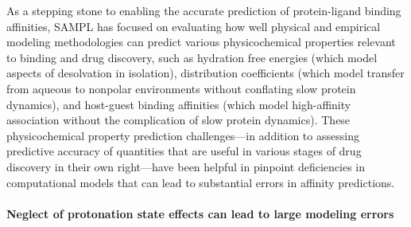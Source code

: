 \documentclass[9pt,lineno]{elife}
\begin{document}
As a stepping stone to enabling the accurate prediction of protein-ligand binding affinities, SAMPL has focused on evaluating how well physical and empirical modeling methodologies can predict various physicochemical properties relevant to binding and drug discovery, such as hydration free energies (which model aspects of desolvation in isolation), distribution coefficients (which model transfer from aqueous to nonpolar environments without conflating slow protein dynamics), and host-guest binding affinities (which model high-affinity association without the complication of slow protein dynamics).
These physicochemical property prediction challenges---in addition to assessing predictive accuracy of quantities that are useful in various stages of drug discovery in their own right---have been helpful in pinpoint deficiencies in computational models that can lead to substantial errors in affinity predictions.

\paragraph{Neglect of protonation state effects can lead to large modeling errors}
\end{document}
